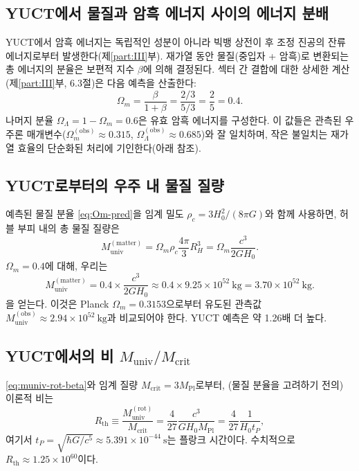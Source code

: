 \documentclass[11pt,a4paper]{article}
\begin{document}
	\subsection{YUCT에서 물질과 암흑 에너지 사이의 에너지 분배}
	
	YUCT에서 암흑 에너지는 독립적인 성분이 아니라 빅뱅 상전이 후 조정 진공의 잔류 에너지로부터 발생한다(제\ref{part:III}부). 재가열 동안 물질(중입자 + 암흑)로 변환되는 총 에너지의 분율은 보편적 지수 \(\beta\)에 의해 결정된다. 섹터 간 결합에 대한 상세한 계산(제\ref{part:III}부, 6.3절)은 다음 예측을 산출한다:
	\begin{equation}
		\Omega_m = \frac{\beta}{1+\beta} = \frac{2/3}{5/3} = \frac{2}{5} = 0.4.
		\label{eq:Om-pred}
	\end{equation}
	나머지 분율 \(\Omega_\Lambda = 1 - \Omega_m = 0.6\)은 유효 암흑 에너지를 구성한다. 이 값들은 관측된 우주론 매개변수(\(\Omega_m^{\mathrm{(obs)}} \approx 0.315\), \(\Omega_\Lambda^{\mathrm{(obs)}} \approx 0.685\))와 잘 일치하며, 작은 불일치는 재가열 효율의 단순화된 처리에 기인한다(아래 참조).
	
	\subsection{YUCT로부터의 우주 내 물질 질량}
	
	예측된 물질 분율 \eqref{eq:Om-pred}을 임계 밀도 \(\rho_c = 3H_0^2/(8\pi G)\)와 함께 사용하면, 허블 부피 내의 총 물질 질량은
	\begin{equation}
		M_{\mathrm{univ}}^{\mathrm{(matter)}} = \Omega_m \rho_c \frac{4\pi}{3} R_H^3 = \Omega_m \frac{c^3}{2 G H_0}.
		\label{eq:muniv-matter}
	\end{equation}
	\(\Omega_m = 0.4\)에 대해, 우리는
	\[
	M_{\mathrm{univ}}^{\mathrm{(matter)}} = 0.4 \times \frac{c^3}{2 G H_0} \approx 0.4 \times 9.25\times 10^{52}\ \mathrm{kg} = 3.70\times 10^{52}\ \mathrm{kg}.
	\]
	을 얻는다. 이것은 Planck \(\Omega_m = 0.3153\)으로부터 유도된 관측값 \(M_{\mathrm{univ}}^{\mathrm{(obs)}} \approx 2.94\times 10^{52}\ \mathrm{kg}\)과 비교되어야 한다. YUCT 예측은 약 1.26배 더 높다.
	
	\subsection{YUCT에서의 비 \(M_{\mathrm{univ}} / M_{\mathrm{crit}}\)}
	
	\eqref{eq:muniv-rot-beta}와 임계 질량 \(M_{\mathrm{crit}} = 3 M_{\mathrm{Pl}}\)로부터, (물질 분율을 고려하기 전의) 이론적 비는
	\begin{equation}
		R_{\mathrm{th}} \equiv \frac{M_{\mathrm{univ}}^{\mathrm{(rot)}}}{M_{\mathrm{crit}}} = \frac{4}{27} \frac{c^3}{G H_0 M_{\mathrm{Pl}}} = \frac{4}{27} \frac{1}{H_0 t_P},
		\label{eq:Rth}
	\end{equation}
	여기서 \(t_P = \sqrt{\hbar G / c^5} \approx 5.391\times 10^{-44}\ \mathrm{s}\)는 플랑크 시간이다. 수치적으로 \(R_{\mathrm{th}} \approx 1.25\times 10^{60}\)이다.
	
\end{document}
